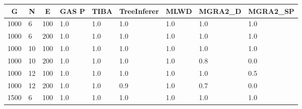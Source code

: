 \begin{table}[H]
  \centering
  \begin{tabular}{|l|l|l|l|l|l|l|l|l|}
    \hline
    \multicolumn{1}{|c|}{G} & \multicolumn{1}{c|}{N} & \multicolumn{1}{c|}{E} & \multicolumn{1}{c|}{GAS P} & \multicolumn{1}{c|}{TIBA} & \multicolumn{1}{c|}{TreeInferer} & \multicolumn{1}{c|}{MLWD} & \multicolumn{1}{c|}{MGRA2\_D} & \multicolumn{1}{c|}{MGRA2\_SP} \\ \hline
    1000                    & 6                      & 100                    & 1.0                        & 1.0                       & 1.0                             & 1.0                       & 1.0                           & 1.0                            \\ \hline
    1000                    & 6                      & 200                    & 1.0                        & 1.0                       & 1.0                             & 1.0                       & 1.0                           & 1.0                            \\ \hline
    1000                    & 10                     & 100                    & 1.0                        & 1.0                       & 1.0                             & 1.0                       & 1.0                           & 1.0                            \\ \hline
    1000                    & 10                     & 200                    & 1.0                        & 1.0                       & 1.0                             & 1.0                       & 0.8                           & 0.0                            \\ \hline
    1000                    & 12                     & 100                    & 1.0                        & 1.0                       & 1.0                             & 1.0                       & 1.0                           & 0.5                            \\ \hline
    1000                    & 12                     & 200                    & 1.0                        & 1.0                       & 0.9                             & 1.0                       & 0.7                           & 0.0                            \\ \hline
    1500                    & 6                      & 100                    & 1.0                        & 1.0                       & 1.0                             & 1.0                       & 1.0                           & 1.0                            \\ \hline

\end{tabular}
\end{table}

